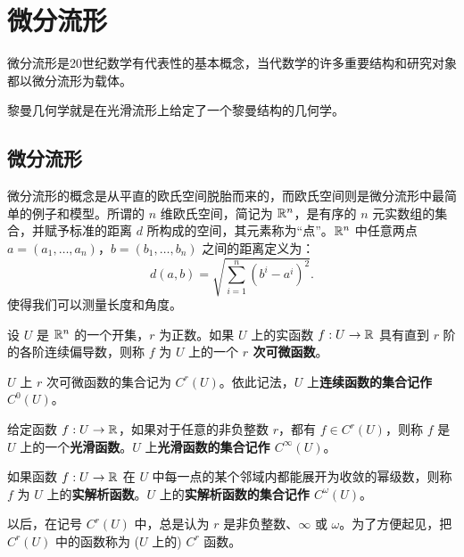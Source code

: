 
\chapter{微分流形}


微分流形是20世纪数学有代表性的基本概念，当代数学的许多重要结构和研究对象都以微分流形为载体。

黎曼几何学就是在光滑流形上给定了一个黎曼结构的几何学。%

\section{微分流形}


微分流形的概念是从平直的欧氏空间脱胎而来的，而欧氏空间则是微分流形中最简单的例子和模型。所谓的 $n$ 维欧氏空间，简记为 $\mathbb{R}^n$，是有序的 $n$ 元实数组的集合，并赋予标准的距离 $d$ 所构成的空间，其元素称为“点”。$\mathbb{R}^n$ 中任意两点 $a=(a_1,\dots,a_n)$，$b=(b_1,\dots,b_n)$ 之间的距离定义为：
$$
d (a, b) = \sqrt {\sum_{i = 1}^{n} (b^{i} - a^{i})^{2}}.
$$
使得我们可以测量长度和角度。

设 $U$ 是 $\mathbb{R}^n$ 的一个开集，$r$ 为正数。如果 $U$ 上的实函数 $f: U \to \mathbb{R}$ 具有直到 $r$ 阶的各阶连续偏导数，则称 $f$ 为 $U$ 上的一个 {\bf $r$ 次可微函数}。

$U$ 上 $r$ 次可微函数的集合记为 $C^r(U)$。依此记法，$U$ 上{\bf 连续函数的集合记作 $C^0(U)$}。

给定函数 $f: U \to \mathbb{R}$，如果对于任意的非负整数 $r$，都有 $f \in C^r(U)$，则称 $f$ 是 $U$ 上的一个{\bf 光滑函数}。$U$ 上{\bf 光滑函数的集合记作 $C^\infty(U)$}。

如果函数 $f: U \to \mathbb{R}$ 在 $U$ 中每一点的某个邻域内都能展开为收敛的幂级数，则称 $f$ 为 $U$ 上的{\bf 实解析函数}。$U$ 上的{\bf 实解析函数的集合记作 $C^\omega(U)$}。

以后，在记号 $C^r(U)$ 中，总是认为 $r$ 是非负整数、$\infty$ 或 $\omega$。为了方便起见，把 $C^r(U)$ 中的函数称为 ($U$ 上的) $C^r$ 函数。

